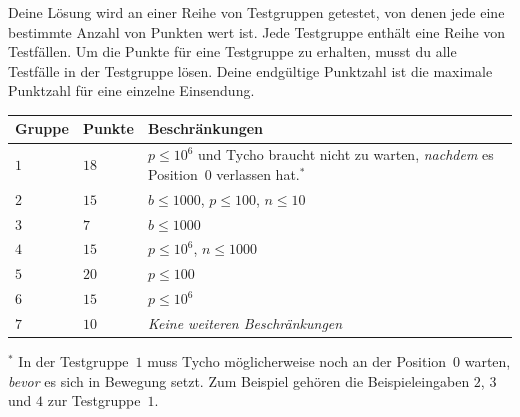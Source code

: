 Deine Lösung wird an einer Reihe von Testgruppen getestet, von denen jede eine bestimmte Anzahl von Punkten wert ist.
Jede Testgruppe enthält eine Reihe von Testfällen.
Um die Punkte für eine Testgruppe zu erhalten, musst du alle Testfälle in der Testgruppe lösen.
Deine endgültige Punktzahl ist die maximale Punktzahl für eine einzelne Einsendung.

\medskip
\begin{tabular}{lll}
Gruppe & Punkte & Beschränkungen \\\hline
  $1$ & $18$  & $p\leq 10^6$ und Tycho braucht nicht zu warten, \emph{nachdem} es Position~$0$ verlassen hat.$^*$ \\ %
  $2$ & $15$  & $b\leq 1000$, $p\leq 100$, $n\leq 10$ \\
  $3$ & $7$  & $b\leq 1000$ \\
  $4$ & $15$ & $p\leq 10^6$, $n\leq 1000$\\
  $5$ & $20$ & $p\leq 100$\\
  $6$ & $15$ & $p\leq 10^6$\\
  $7$ & $10$ & \emph{Keine weiteren Beschränkungen}
\end{tabular}

\medskip
\noindent $^*$ In der Testgruppe~$1$ muss Tycho möglicherweise noch an der Position~$0$ warten, \emph{bevor} es sich in Bewegung setzt.
Zum Beispiel gehören die Beispieleingaben $2$, $3$ und $4$ zur Testgruppe~$1$.
